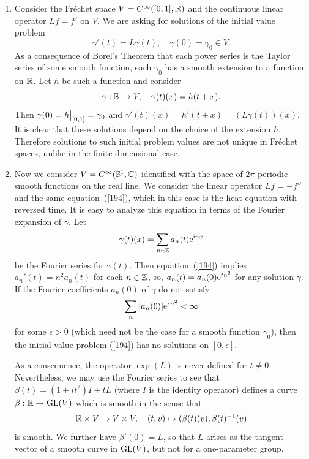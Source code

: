 \begin{rem}
    \begin{enumerate}[label=(\alph*)]
        \item Consider the Fr\'echet space $V=C^\infty([0,1],\mathbb{R})$ and the continuous linear operator $Lf=f'$ on $V$. We are asking for solutions of the initial value problem
        \[\gamma'(t)=L\gamma(t), \quad \gamma(0)=\gamma_0\in V.\label{194}\]
        As a consequence of Borel's Theorem that each power series is the Taylor series of some smooth function, each $\gamma_0$ has a smooth extension to a function on $\mathbb{R}$. Let $h$ be such a function and consider
        \[\gamma:\mathbb{R}\to V, \quad \gamma(t)(x)=h(t+x).\]
        Then $\gamma(0)=\restr{h}{[0,1]}=\gamma_0$ and $\gamma'(t)(x)=h'(t+x)=(L\gamma(t))(x)$. It is clear that these solutions depend on the choice of the extension $h$. Therefore solutions to such initial problem values are not unique in Fr\'echet spaces, unlike in the finite-dimensional case.
        
        \item Now we consider $V=C^\infty(\mathbb{S}^1,\mathbb{C})$ identified with the space of $2\pi$-periodic smooth functions on the real line. We consider the linear operator $Lf=-f''$ and the same equation~(\ref{194}), which in this case is the heat equation with reversed time. It is easy to analyze this equation in terms of the Fourier expansion of $\gamma$. Let
        \[\gamma(t)(x)=\sum_{n\in \mathbb{Z}} a_n(t)\mathrm{e}^{\mathrm{i} nx}\]
        be the Fourier series for $\gamma(t)$. Then equation~(\ref{194}) implies $a_n'(t)=n^2a_n(t)$ for each $n\in\mathbb{Z}$, so, $a_n(t)=a_n(0)\mathrm{e}^{tn^2}$ for any solution $\gamma$. If the Fourier coefficients $a_n(0)$ of $\gamma$ do not satisfy
        \[\sum_n |a_n(0)|\mathrm{e}^{\epsilon n^2}<\infty\]
        for some $\epsilon>0$ (which need not be the case for a smooth function $\gamma_0$), then the initial value problem (\ref{194}) has no solutions on $[0,\epsilon]$.

        As a consequence, the operator $\exp(L)$ is never defined for $t\neq 0$. Nevertheless, we may use the Fourier series to see that $\beta(t)=(1+it^2)I+tL$ (where $I$ is the identity operator) defines a curve $\beta:\mathbb{R}\to \operatorname{GL}(V)$ which is smooth in the sense that 
        \[\mathbb{R}\times V\to V\times V,\quad (t,v)\mapsto (\beta(t)(v),\beta(t)^{-1}(v)\]
        is smooth. We further have $\beta'(0)=L$, so that $L$ arises as the tangent vector of a smooth curve in $\operatorname{GL}(V)$, but not for a one-parameter group.
    \end{enumerate}
\end{rem}

